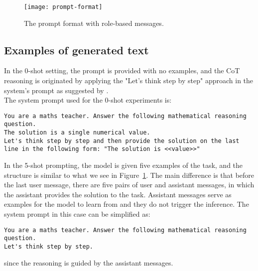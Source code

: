 \begin{figure}[h!]
	\centering
	\texttt{[image: prompt-format]}
	\caption{The prompt format with role-based messages.}
	\label{fig:prompt-format}
\end{figure}

\subsection{Examples of generated text}
\label{subsec:examples-of-generated-text}

In the 0-shot setting, the prompt is provided with no examples, and the CoT reasoning is originated by applying the "Let's think step by step" approach in the system's prompt as suggested by \textcite{kojima2023large}.\\

The system prompt used for the 0-shot experiments is:
\begin{Verbatim}[fontsize=\small,breaklines]
You are a maths teacher. Answer the following mathematical reasoning question.
The solution is a single numerical value.
Let's think step by step and then provide the solution on the last line in the following form: "The solution is <<value>>"
\end{Verbatim}

In the 5-shot prompting, the model is given five examples of the task, and the structure is similar to what we see in Figure~\ref{fig:prompt-format}.
The main difference is that before the last user message, there are five pairs of user and assistant messages, in which the assistant provides the solution to the task.
Assistant messages serve as examples for the model to learn from and they do not trigger the inference.
The system prompt in this case can be simplified as:
\begin{Verbatim}[fontsize=\small,breaklines]
You are a maths teacher. Answer the following mathematical reasoning question.
Let's think step by step.
\end{Verbatim}
since the reasoning is guided by the assistant messages.

